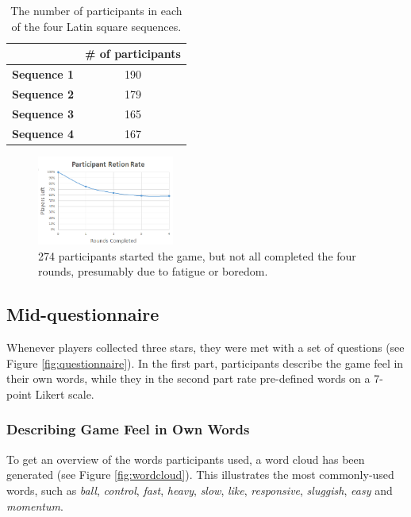 \begin{table}[htbp]
\scriptsize
\centering
\begin{tabular}{|c|c|}
\hline
 & \textbf{\# of participants}\\
 \hline
\textbf{Sequence 1} & 190\\
\hline
\textbf{Sequence 2} & 179\\
\hline
\textbf{Sequence 3} & 165\\
\hline
\textbf{Sequence 4} & 167\\
\hline
\end{tabular}
\caption{The number of participants in each of the four Latin square sequences.}
\label{table:latinSequenceNumber}
\end{table}

\begin{figure}[htbp]
\centering
\includegraphics[width=0.4\textwidth]{Pics/retetionRate}
\caption{274 participants started the game, but not all completed the four rounds, presumably due to fatigue or boredom.}
\label{fig:retention}
\end{figure}

\subsection{Mid-questionnaire}
Whenever players collected three stars, they were met with a set of questions (see Figure \ref{fig:questionnaire}). In the first part, participants describe the game feel in their own words, while they in the second part rate pre-defined words on a 7-point Likert scale.

\subsubsection{Describing Game Feel in Own Words}
To get an overview of the words participants used, a word cloud has been generated (see Figure \ref{fig:wordcloud}). This illustrates the most commonly-used words, such as \textit{ball}, \textit{control}, \textit{fast}, \textit{heavy}, \textit{slow}, \textit{like}, \textit{responsive}, \textit{sluggish}, \textit{easy} and \textit{momentum}.

